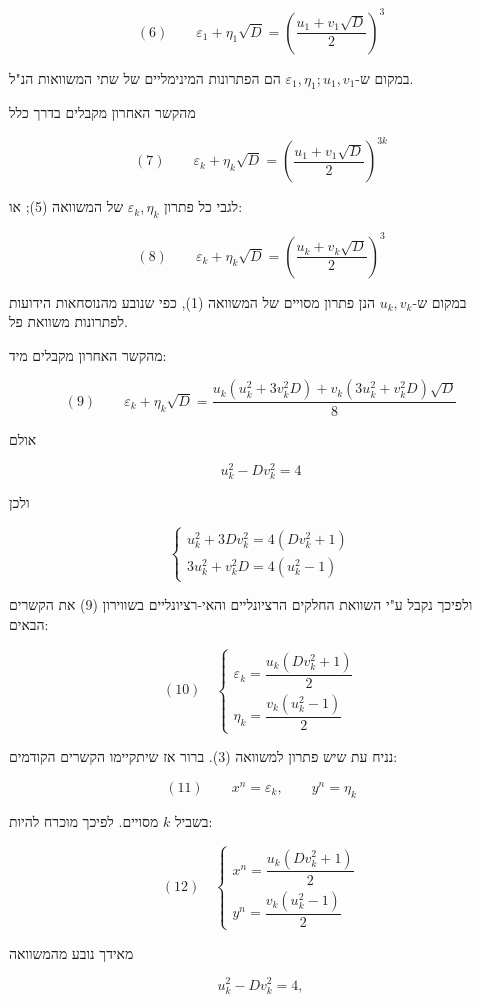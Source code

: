 \[ (6) \qquad \varepsilon_1 + \eta_1\sqrt{D} = \left(\frac{u_1 + v_1\sqrt{D}}{2}\right)^3 \]

במקום ש-$\varepsilon_1, \eta_1 ; u_1, v_1$ הם הפתרונות המינימליים של שתי
המשוואות הנ"ל.

מהקשר האחרון מקבלים בדרך כלל

\[ (7) \qquad \varepsilon_k + \eta_k\sqrt{D} = \left(\frac{u_1 + v_1\sqrt{D}}{2}\right)^{3k} \]

\noindent לגבי כל פתרון $\varepsilon_k, \eta_k$ של המשוואה (5); או:

\[ (8) \qquad \varepsilon_k + \eta_k\sqrt{D} = \left(\frac{u_k + v_k\sqrt{D}}{2}\right)^3 \]

במקום ש-$u_k, v_k$ הנן פתרון מסויים של המשוואה (1), כפי שנובע
מהנוסחאות הידועות לפתרונות משוואת פל.

מהקשר האחרון מקבלים מיד:

\[ (9) \qquad \varepsilon_k + \eta_k\sqrt{D} =
\frac{u_k(u_k^2 + 3v_k^2 D) + v_k(3u_k^2 + v_k^2 D)\sqrt{D}}{8} \]

אולם

\[ u_k^2 - Dv_k^2 = 4 \]

ולכן

\[
\begin{cases}
u_k^2 + 3Dv_k^2 = 4(Dv_k^2 + 1) \\
3u_k^2 + v_k^2 D = 4(u_k^2 - 1)
\end{cases}
\]

ולפיכך נקבל ע"י השוואת החלקים הרציונליים והאי-רציונליים בשווירון
(9) את הקשרים הבאים:

\[ (10) \quad
\begin{cases}
\varepsilon_k = \dfrac{u_k(Dv_k^2 + 1)}{2} \\[6pt]
\eta_k = \dfrac{v_k(u_k^2 - 1)}{2}
\end{cases}
\]

נניח עת שיש פתרון למשוואה (3). ברור אז שיתקיימו הקשרים הקודמים:

\[ (11) \qquad x^n = \varepsilon_k , \qquad y^n = \eta_k \]

בשביל $k$ מסויים. לפיכך מוכרח להיות:

\[ (12) \quad
\begin{cases}
x^n = \dfrac{u_k(Dv_k^2 + 1)}{2} \\[6pt]
y^n = \dfrac{v_k(u_k^2 - 1)}{2}
\end{cases}
\]

מאידך נובע מהמשוואה

\[ u_k^2 - Dv_k^2 = 4 , \]

